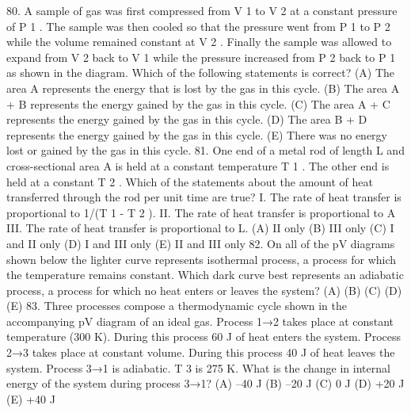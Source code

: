80. A sample of gas was first compressed from V 1 to V 2 at a constant pressure of P 1 . The sample was then cooled
so that the pressure went from P 1 to P 2 while the volume remained constant at V 2 . Finally the sample was
allowed to expand from V 2 back to V 1 while the pressure increased from P 2 back to P 1 as shown in the
diagram. Which of the following statements is correct?
(A) The area A represents the energy that is lost by the gas in this cycle.
(B) The area A + B represents the energy gained by the gas in this cycle.
(C) The area A + C represents the energy gained by the gas in this cycle.
(D) The area B + D represents the energy gained by the gas in this cycle.
(E) There was no energy lost or gained by the gas in this cycle.
81. One end of a metal rod of length L and cross-sectional area A is held at a constant temperature T 1 . The other end
is held at a constant T 2 . Which of the statements about the amount of heat transferred through the rod per unit
time are true?
I. The rate of heat transfer is proportional to 1/(T 1 - T 2 ).
II. The rate of heat transfer is proportional to A
III. The rate of heat transfer is proportional to L.
(A) II only (B) III only (C) I and II only (D) I and III only (E) II and III only
82. On all of the pV diagrams shown below the lighter curve represents isothermal process, a process for which the
temperature remains constant. Which dark curve best represents an adiabatic process, a process for which no
heat enters or leaves the system?
(A)
(B)
(C)
(D)
(E)
83. Three processes compose a thermodynamic cycle shown in the accompanying pV diagram of an ideal gas.
Process 1→2 takes place at constant temperature (300 K). During this process 60 J of heat enters the system.
Process 2→3 takes place at constant volume. During this process 40 J of heat leaves the system.
Process 3→1 is adiabatic. T 3 is 275 K.
What is the change in internal energy of the system during process 3→1?
(A) –40 J (B) –20 J (C) 0 J (D) +20 J (E) +40 J




\endinput


